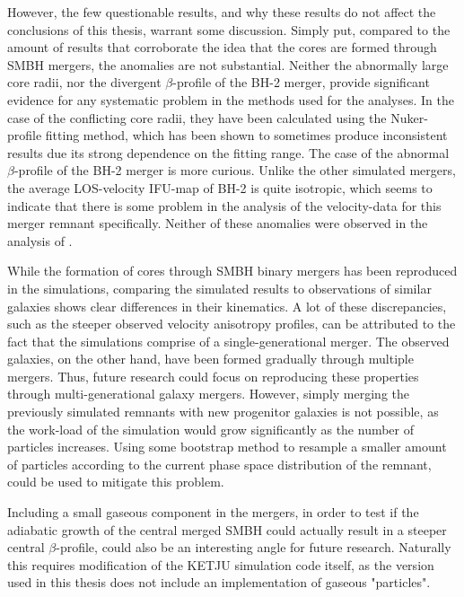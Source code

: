 \documentclass[english, twoside]{HYgradu}
\begin{document}
However, the few questionable results, and why these results do not affect the conclusions of this thesis, warrant some discussion. Simply put, compared to the amount of results that corroborate the idea that the cores are formed through SMBH mergers, the anomalies are not substantial. Neither the abnormally large core radii, nor the divergent $\beta$-profile of the BH-2 merger, provide significant evidence for any systematic problem in the methods used for the analyses. In the case of the conflicting core radii, they have been calculated using the Nuker-profile fitting method, which has been shown to sometimes produce inconsistent results due its strong dependence on the fitting range. The case of the abnormal $\beta$-profile of the BH-2 merger is more curious. Unlike the other simulated mergers, the average LOS-velocity IFU-map of BH-2 is quite isotropic, which seems to indicate that there is some problem in the analysis of the velocity-data for this merger remnant specifically. Neither of these anomalies were observed in the analysis of \cite{Rantala2018}.

While the formation of cores through SMBH binary mergers has been reproduced in the simulations, comparing the simulated results to observations of similar galaxies shows clear differences in their kinematics. A lot of these discrepancies, such as the steeper observed velocity anisotropy profiles, can be attributed to the fact that the simulations comprise of a single-generational merger. The observed galaxies, on the other hand, have been formed gradually through multiple mergers. Thus, future research could focus on reproducing these properties through multi-generational galaxy mergers. However, simply merging the previously simulated remnants with new progenitor galaxies is not possible, as the work-load of the simulation would grow significantly as the number of particles increases. Using some bootstrap method to resample a smaller amount of particles according to the current phase space distribution of the remnant, could be used to mitigate this problem.

Including a small gaseous component in the mergers, in order to test if the adiabatic growth of the central merged SMBH could actually result in a steeper central $\beta$-profile, could also be an interesting angle for future research. Naturally this requires modification of the KETJU simulation code itself, as the version used in this thesis does not include an implementation of gaseous "particles". 
\end{document}
